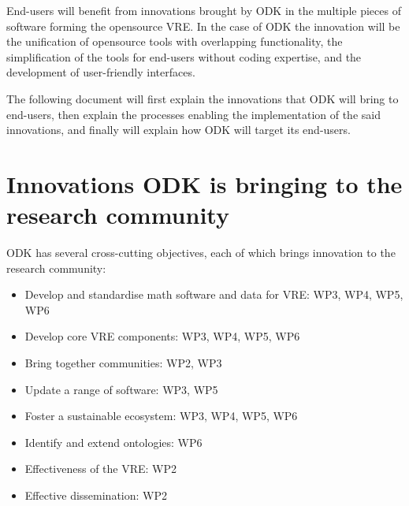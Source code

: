 \documentclass{deliverablereport}
\begin{document}
End-users will benefit from innovations brought by ODK in the
multiple pieces of software forming the opensource VRE. In the case of
ODK the innovation will be the unification of opensource
tools with overlapping functionality, the simplification of the tools
for end-users without coding expertise, and the development of
user-friendly interfaces.

The following document will first explain the innovations that
ODK will bring to end-users, then explain the processes
enabling the implementation of the said innovations, and finally will
explain how ODK will target its end-users.


\section{Innovations ODK is bringing to the research community}

ODK has several cross-cutting objectives, each of which
brings innovation to the research community:
\begin{itemize}
\item{Develop and standardise math software and data for VRE: WP3, WP4, WP5, WP6}
\item{Develop core VRE components: WP3, WP4, WP5, WP6}
\item{Bring together communities: WP2, WP3}
\item{Update a range of software: WP3, WP5}
\item{Foster a sustainable ecosystem: WP3, WP4, WP5, WP6}
\item{Identify and extend ontologies: WP6}
\item{Effectiveness of the VRE: WP2}
\item{Effective dissemination: WP2}
\end{itemize}
\end{document}
